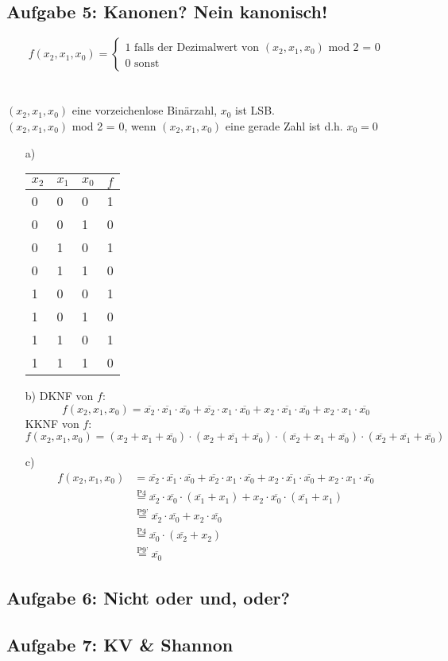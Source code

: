 \documentclass{article}
\begin{document}
    
    \subsection*{Aufgabe 5: Kanonen? Nein kanonisch!}
    \[
    f(x_2,x_1,x_0) = \begin{cases}
    	1 \text{ falls der Dezimalwert von }(x_2,x_1,x_0) \text{ mod 2 = 0} \\
    	0 \text{ sonst}
    	\end{cases}    
    \]\\\\
    $(x_2,x_1,x_0)$ eine vorzeichenlose Binärzahl, $x_0$ ist LSB.\\
    $(x_2,x_1,x_0)$ mod 2 = 0, wenn $(x_2,x_1,x_0)$ eine gerade Zahl ist d.h. $x_0 = 0$
    \begin{itemize}
    	\item[a)]
    	\begin{tabular}[t]{lll|l}
    		$x_2$&$x_1$&$x_0$&$f$ \\
    		\hline
    		0&0&0&1 \\
    		0&0&1&0 \\
    		0&1&0&1 \\
    		0&1&1&0 \\
    		1&0&0&1 \\
    		1&0&1&0 \\
    		1&1&0&1 \\
    		1&1&1&0 \\
    	\end{tabular}
    	\item[b)]DKNF von $f$: $$f(x_2,x_1,x_0) = \overline{x_2}\cdot\overline{x_1}\cdot\overline{x_0} + \overline{x_2}\cdot x_1\cdot\overline{x_0} + x_2\cdot\overline{x_1}\cdot\overline{x_0} + x_2\cdot x_1\cdot\overline{x_0}$$
    	KKNF von $f$: $$f(x_2,x_1,x_0) = (x_2+x_1+\overline{x_0})\cdot(x_2+\overline{x_1}+\overline{x_0})\cdot(\overline{x_2}+x_1+\overline{x_0})\cdot(\overline{x_2}+\overline{x_1}+\overline{x_0})$$
    	\item[c)]
    	\begin{align*}
    		f(x_2,x_1,x_0) & = \overline{x_2}\cdot\overline{x_1}\cdot\overline{x_0} + \overline{x_2}\cdot x_1\cdot\overline{x_0} + x_2\cdot\overline{x_1}\cdot\overline{x_0} + x_2\cdot x_1\cdot\overline{x_0} \\
    		& \stackrel{\text{P4}}{=} \overline{x_2} \cdot\overline{x_0}\cdot(\overline{x_1} + x_1) + x_2 \cdot\overline{x_0}\cdot(\overline{x_1} + x_1) \\
    		& \stackrel{\text{P9'}}{=} \overline{x_2} \cdot\overline{x_0} + x_2 \cdot\overline{x_0} \\
    		& \stackrel{\text{P4}}{=} \overline{x_0}\cdot(\overline{x_2} + x_2) \\
    		& \stackrel{\text{P9'}}{=} \overline{x_0}
    	\end{align*}
    \end{itemize}
    
    
    \subsection*{Aufgabe 6: Nicht oder und, oder?}
    
    
    \subsection*{Aufgabe 7: KV \& Shannon}
    
\end{document}
